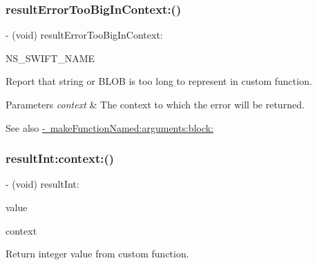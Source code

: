 \subsubsection{\texorpdfstring{result\+Error\+Too\+Big\+In\+Context\+:()}{resultErrorTooBigInContext:()}}
{\footnotesize\ttfamily -\/ (void) result\+Error\+Too\+Big\+In\+Context\+: \begin{DoxyParamCaption}\item[{(result\+Error\+Too\+Big(context\+:))}]{N\+S\+\_\+\+S\+W\+I\+F\+T\+\_\+\+N\+A\+ME }\end{DoxyParamCaption}}

Report that string or B\+L\+OB is too long to represent in custom function.


\begin{DoxyParams}{Parameters}
{\em context} & The context to which the error will be returned.\\
\hline
\end{DoxyParams}
\begin{DoxySeeAlso}{See also}
\mbox{\hyperlink{interface_o_p_t_l_y_f_m_d_b_database_af2c3e10041c8d0a95e2feb84a2ffa645}{-\/ make\+Function\+Named\+:arguments\+:block\+:}} 
\end{DoxySeeAlso}
\mbox{\label{interface_o_p_t_l_y_f_m_d_b_database_adc1fa43c23f123a21fa106f9a7f6482f}} 
\subsubsection{\texorpdfstring{result\+Int\+:context\+:()}{resultInt:context:()}}
{\footnotesize\ttfamily -\/ (void) result\+Int\+: \begin{DoxyParamCaption}\item[{(int)}]{value }\item[{context:(void $\ast$)}]{context }\end{DoxyParamCaption}}

Return integer value from custom function.



